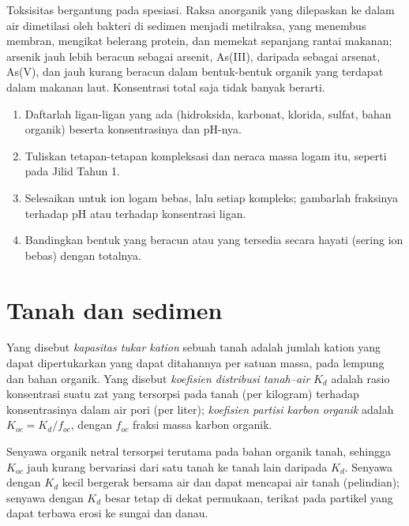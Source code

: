 Toksisitas bergantung pada spesiasi. Raksa anorganik yang dilepaskan ke dalam air
dimetilasi oleh bakteri di sedimen menjadi metilraksa, yang menembus membran,
mengikat belerang protein, dan memekat sepanjang rantai makanan; arsenik jauh lebih
beracun sebagai arsenit, As(III), daripada sebagai arsenat, As(V), dan jauh kurang beracun dalam bentuk-bentuk
organik yang terdapat dalam makanan laut. Konsentrasi total saja tidak banyak berarti.

\begin{method}\label{met:b3:environmental-toxicology:speciation}
\begin{enumerate}
  \item Daftarlah ligan-ligan yang ada (hidroksida, karbonat, klorida, sulfat, bahan
        organik) beserta konsentrasinya dan pH-nya.
  \item Tuliskan tetapan-tetapan kompleksasi dan neraca massa logam itu, seperti pada
        Jilid Tahun 1.
  \item Selesaikan untuk ion logam bebas, lalu setiap kompleks; gambarlah fraksinya terhadap
        pH atau terhadap konsentrasi ligan.
  \item Bandingkan bentuk yang beracun atau yang tersedia secara hayati (sering ion bebas) dengan totalnya.
\end{enumerate}
\end{method}

\section{Tanah dan sedimen}

\begin{definition}\label{def:b3:environmental-toxicology:soil}
Yang disebut \emph{kapasitas tukar kation} sebuah tanah adalah
jumlah kation yang dapat dipertukarkan yang dapat ditahannya per satuan massa, pada lempung dan bahan
organik. Yang disebut \emph{koefisien distribusi tanah--air}
$K_d$ adalah rasio konsentrasi suatu zat yang
tersorpsi pada tanah (per kilogram) terhadap konsentrasinya dalam air pori (per
liter); \emph{koefisien partisi karbon organik}
adalah $K_{oc} = K_d/f_{oc}$, dengan $f_{oc}$ fraksi massa karbon organik.
\end{definition}

Senyawa organik netral tersorpsi terutama pada bahan organik tanah, sehingga $K_{oc}$ jauh
kurang bervariasi dari satu tanah ke tanah lain daripada $K_d$. Senyawa dengan $K_d$ kecil bergerak bersama air
dan dapat mencapai air tanah (pelindian); senyawa dengan $K_d$ besar tetap di dekat permukaan,
terikat pada partikel yang dapat terbawa erosi ke sungai dan danau.

